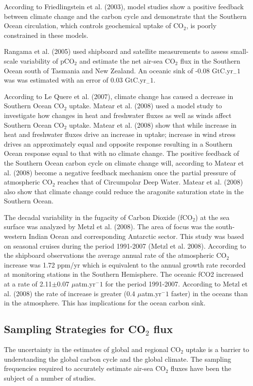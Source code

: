 \documentclass[11pt, a4paper]{article}
\numberwithin{figure}{section}
\numberwithin{table}{section}
\begin{document}
According to Friedlingstein et al. (2003), model studies show a positive 
feedback between climate change and the carbon cycle and demonstrate that the Southern 
Ocean circulation, which controls geochemical uptake of CO$_2$, is poorly 
constrained in these models.

Rangama et al. (2005) used shipboard and satellite measurements to assess 
small-scale variability of pCO$_2$ and estimate the net air-sea CO$_2$ flux in 
the Southern Ocean south of Tasmania and New Zealand. An oceanic sink of -0.08 
GtC.yr$_-1$ was was estimated with an error of 0.03 GtC.yr$_-1$.

According to Le Quere et al. (2007), climate change has caused a decrease in 
Southern Ocean CO$_2$ uptake. 
Matear et al. (2008) used a model study to investigate how changes in heat and 
freshwater fluxes as well as winds affect Southern Ocean CO$_2$ uptake. 
Matear et al. (2008) 
show that while increase in heat and freshwater fluxes drive an increase in 
uptake; increase in wind stress drives an approximately equal and opposite 
response resulting in a Southern Ocean response equal to that with no climate change.
The positive feedback of the Southern Ocean carbon 
cycle on climate change will, according to Matear et al. (2008) 
become a negative feedback mechanism once the 
partial pressure of atmospheric CO$_2$ reaches that of Circumpolar Deep Water. 
Matear et al. (2008) also show that climate change 
could reduce the aragonite saturation state in the Southern Ocean.

The decadal variability in the fugacity of Carbon Dioxide (fCO$_{2}$) 
at the sea surface was analyzed by Metzl et al. (2008). The area of focus 
was the south-western Indian Ocean and corresponding Antarctic sector. 
This study was based on seasonal cruises during the period 1991-2007 
(Metzl et al. 2008). 
According to the shipboard observations the average 
annual rate of the atmospheric CO$_{2}$
increase was 1.72 ppm/yr which is equivalent to the annual growth rate 
recorded at monitoring stations in the Southern Hemisphere. 
The oceanic fCO2 increased at a rate of 2.11$\pm$0.07 $\mu$atm.yr$^-1$ 
for the period 1991-2007. 
According to Metzl et al. (2008) the rate of increase is greater 
(0.4 $\mu$atm.yr$^-1$ faster) in the oceans than in the atmosphere. This has 
implications for the ocean carbon sink.

\subsection{Sampling Strategies for CO$_2$ flux}
The uncertainty in the estimates of global and regional CO$_2$ uptake is a barrier 
to understanding the global carbon cycle and the global climate. The sampling 
frequencies required to accurately estimate air-sea CO$_2$ fluxes have been the 
subject of a number of studies.
\end{document}
